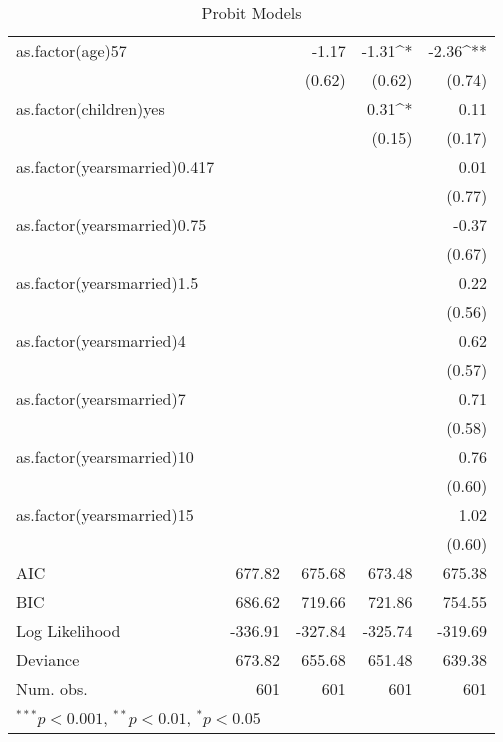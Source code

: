 \begin{table}[hb!]
\begin{center}
\begin{tabular}{l D{.}{.}{4.5} D{.}{.}{4.3} D{.}{.}{4.3} D{.}{.}{4.4} }
as.factor(age)57             &             & -1.17     & -1.31^{*} & -2.36^{**} \\
                             &             & (0.62)    & (0.62)    & (0.74)     \\
as.factor(children)yes       &             &           & 0.31^{*}  & 0.11       \\
                             &             &           & (0.15)    & (0.17)     \\
as.factor(yearsmarried)0.417 &             &           &           & 0.01       \\
                             &             &           &           & (0.77)     \\
as.factor(yearsmarried)0.75  &             &           &           & -0.37      \\
                             &             &           &           & (0.67)     \\
as.factor(yearsmarried)1.5   &             &           &           & 0.22       \\
                             &             &           &           & (0.56)     \\
as.factor(yearsmarried)4     &             &           &           & 0.62       \\
                             &             &           &           & (0.57)     \\
as.factor(yearsmarried)7     &             &           &           & 0.71       \\
                             &             &           &           & (0.58)     \\
as.factor(yearsmarried)10    &             &           &           & 0.76       \\
                             &             &           &           & (0.60)     \\
as.factor(yearsmarried)15    &             &           &           & 1.02       \\
                             &             &           &           & (0.60)     \\
\midrule
AIC                          & 677.82      & 675.68    & 673.48    & 675.38     \\
BIC                          & 686.62      & 719.66    & 721.86    & 754.55     \\
Log Likelihood               & -336.91     & -327.84   & -325.74   & -319.69    \\
Deviance                     & 673.82      & 655.68    & 651.48    & 639.38     \\
Num. obs.                    & 601         & 601       & 601       & 601        \\
\bottomrule
{}
\end{tabular}
\caption{Probit Models}
\label{tab:3}
\end{center}
\end{table}
